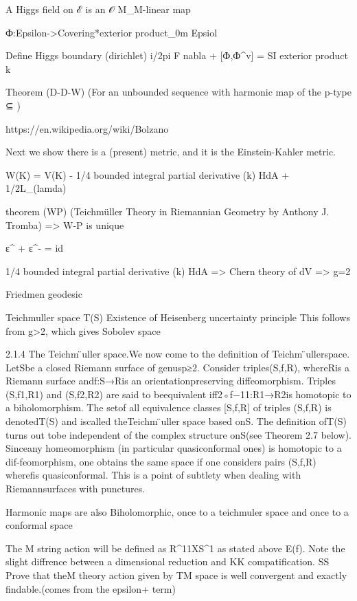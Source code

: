 A Higgs field on ℰ is an 𝒪 M_M-linear map

Ф:Epsilon->Covering*exterior product_0m Epsiol

Define Higgs boundary (dirichlet) 
i/2pi F nabla + [Ф,Ф^v] = SI exterior product k 

Theorem (D-D-W)  
(For an unbounded sequence with harmonic map of the p-type ⊆ )

https://en.wikipedia.org/wiki/Bolzano%

Next we show there is a (present) metric, and it is the Einstein-Kahler metric.

W(K) = V(K) - 1/4 bounded integral partial derivative (k) HdA + 1/2L_(lamda)    

theorem (WP)
(Teichmüller Theory in Riemannian Geometry by Anthony J. Tromba)
=> W-P is unique 

ε^ + ε^- = id 

1/4 bounded integral partial derivative (k) HdA 
=> Chern theory of dV
=> g=2  

Friedmen geodesic

Teichmuller space T(S)
Existence of Heisenberg uncertainty principle
This follows from g>2, which gives Sobolev space

2.1.4 The Teichm ̈uller space.We now come to the definition of Teichm ̈ullerspace. LetSbe a closed Riemann surface of genusp≥2. 
Consider triples(S,f,R), whereRis a Riemann surface andf:S→Ris an orientationpreserving diffeomorphism. Triples (S,f1,R1) and (S,f2,R2) 
are said to beequivalent iff2◦f−11:R1→R2is homotopic to a biholomorphism. The setof all equivalence classes [S,f,R] of triples (S,f,R) is denotedT(S) and iscalled theTeichm ̈uller space based onS. The definition ofT(S) turns out tobe independent of the complex structure onS(see Theorem 2.7 below). Sinceany homeomorphism (in particular quasiconformal ones) is homotopic to a dif-feomorphism, one obtains the same space if one considers pairs (S,f,R) wherefis quasiconformal. This is a point of subtlety when dealing with Riemannsurfaces with punctures.

Harmonic maps are also 	Biholomorphic, once to a teichmuler space and once to a conformal space

The M string action will be defined as R^11XS^1 as stated above E(f). Note the slight diffrence between a dimensional reduction and KK compatification.
SS 
Prove that theM theory action given by TM space is well convergent and exactly findable.(comes from the epsilon+ term)

